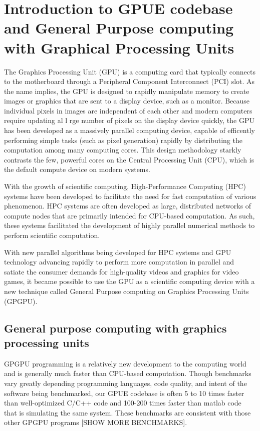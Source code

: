 \chapter{Introduction to GPUE codebase and General Purpose computing with Graphical Processing Units}
\label{ch:gpu}

The Graphics Processing Unit (GPU) is a computing card that typically connects to the motherboard through a Peripheral Component Interconnect (PCI) slot.
As the name implies,
the GPU is designed to rapidly manipulate memory to create images or graphics that are sent to a display device, such as a monitor.
Because individual pixels in images are independent of each other and modern computers require updating al l rge number of pixels on the display device quickly, the GPU has been developed as a massively parallel computing device, capable of efficently performing simple tasks (such as pixel generation) rapidly by distributing the computation among many computing cores.
This design methodology starkly contrasts the few, powerful cores on the Central Processing Unit (CPU), which is the default compute device on modern systems.

With the growth of scientific computing, High-Performance Computing (HPC) systems have been developed to facilitate the need for fast computation of various phenomenon.
HPC systems are often developed as large, distributed networks of compute nodes that are primarily intended for CPU-based computation.
As such, these systems facilitated the development of highly parallel numerical methods to perform scientific computation.

With new parallel algorithms being developed for HPC systems and GPU technology advancing rapidly to perform more computation in parallel and satiate the consumer demands for high-quality videos and graphics for video games, it became possible to use the GPU as a scientific computing device with a new technique called General Purpose computing on Graphics Processing Units (GPGPU).

\section{General purpose computing with graphics processing units}

GPGPU programming is a relatively new development to the computing world and is generally much faster than CPU-based computation.
Though benchmarks vary greatly depending programming languages, code quality, and intent of the software being benchmarked, our GPUE codebase is often 5 to 10 times faster than well-optimized C/C++ code and 100-200 times faster than matlab code that is simulating the same system.
These benchmarks are consistent with those other GPGPU programs [SHOW MORE BENCHMARKS].

